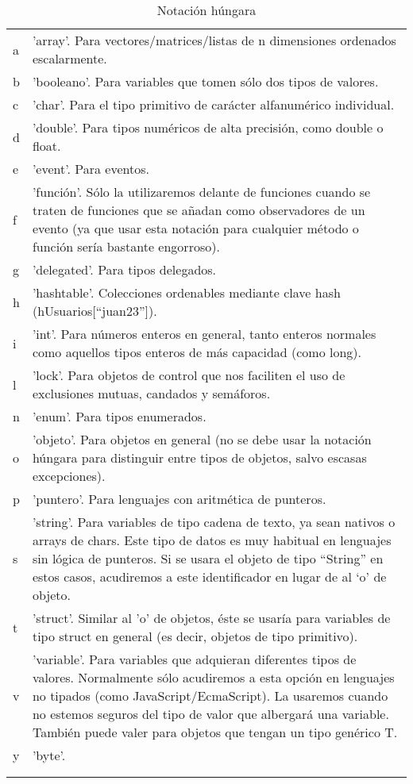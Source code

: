 \begin{center}
\begin{longtable}{p{2cm} p{10cm}}
a  &	'array'. Para vectores/matrices/listas de n dimensiones ordenados escalarmente. \\
b &	'booleano'. Para variables que tomen sólo dos tipos de valores. \\
c &	'char'. Para el tipo primitivo de carácter alfanumérico individual. \\
d &	'double'. Para tipos numéricos de alta precisión, como double o float. \\
e &	'event'. Para eventos. \\
f &	'función'. Sólo la utilizaremos delante de funciones cuando se traten de funciones que se añadan como observadores de un evento (ya que usar esta notación para cualquier método o función sería bastante engorroso). \\
g &	'delegated'. Para tipos delegados. \\
h &	'hashtable'. Colecciones ordenables mediante clave hash (hUsuarios[“juan23”]). \\
i &	'int'. Para números enteros en general, tanto enteros normales como aquellos tipos enteros de más capacidad (como long). \\
l &	'lock'. Para objetos de control que nos faciliten el uso de exclusiones mutuas, candados y semáforos. \\
n &	'enum'. Para tipos enumerados. \\
o &	'objeto'. Para objetos en general (no se debe usar la notación húngara para distinguir entre tipos de objetos, salvo escasas excepciones). \\
p &	'puntero'. Para lenguajes con aritmética de punteros. \\
s &	'string'. Para variables de tipo cadena de texto, ya sean nativos o arrays de chars. Este tipo de datos es muy habitual en lenguajes sin lógica de punteros. Si se usara el objeto de tipo “String” en estos casos, acudiremos a este identificador en lugar de al ‘o’ de objeto. \\
t &	'struct'. Similar al 'o' de objetos, éste se usaría para variables de tipo struct en general (es decir, objetos de tipo primitivo). \\
v &	'variable'. Para variables que adquieran diferentes tipos de valores. Normalmente sólo acudiremos a esta opción en lenguajes no tipados (como JavaScript/EcmaScript). La usaremos cuando no estemos seguros del tipo de valor que albergará una variable. También puede valer para objetos que tengan un tipo genérico T. \\
y &	'byte'. \\


\caption{Notación húngara}\\
\label{tab:notation}
\end{longtable}
\end{center}

